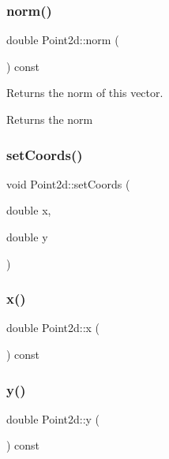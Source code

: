 \subsubsection{\texorpdfstring{norm()}{norm()}}
{\footnotesize\ttfamily double Point2d\+::norm (\begin{DoxyParamCaption}{ }\end{DoxyParamCaption}) const}

Returns the norm of this vector. \begin{DoxyReturn}{Returns}
the norm 
\end{DoxyReturn}
\mbox{\label{class_point2d_a1437edf04ae16b4fb9869d0ae85f7988}} 
\subsubsection{\texorpdfstring{set\+Coords()}{setCoords()}}
{\footnotesize\ttfamily void Point2d\+::set\+Coords (\begin{DoxyParamCaption}\item[{double}]{x,  }\item[{double}]{y }\end{DoxyParamCaption})}

\mbox{\label{class_point2d_ae9ebef830d57fb7c1f198284f6b6bd82}} 
\subsubsection{\texorpdfstring{x()}{x()}}
{\footnotesize\ttfamily double Point2d\+::x (\begin{DoxyParamCaption}{ }\end{DoxyParamCaption}) const\hspace{0.3cm}{\ttfamily [inline]}}

\mbox{\label{class_point2d_ad6a141e4b4612b3b2ce83e6f00f4ea26}} 
\subsubsection{\texorpdfstring{y()}{y()}}
{\footnotesize\ttfamily double Point2d\+::y (\begin{DoxyParamCaption}{ }\end{DoxyParamCaption}) const\hspace{0.3cm}{\ttfamily [inline]}}



